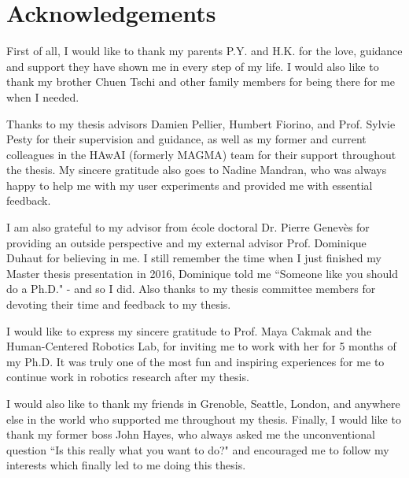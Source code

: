 \chapter*{Acknowledgements}
First of all, I would like to thank my parents P.Y. and H.K. for the love, guidance and support they have shown me in every step of my life.
I would also like to thank my brother Chuen Tschi and other family members for being there for me when I needed.

Thanks to my thesis advisors Damien Pellier, Humbert Fiorino, and Prof. Sylvie Pesty for their supervision and guidance, as well as my former and current colleagues in the HAwAI (formerly MAGMA) team for their support throughout the thesis.
My sincere gratitude also goes to Nadine Mandran, who was always happy to help me with my user experiments and provided me with essential feedback.

I am also grateful to my advisor from école doctoral Dr. Pierre Genevès for providing an outside perspective and my external advisor Prof. Dominique Duhaut for believing in me.
I still remember the time when I just finished my Master thesis presentation in 2016, Dominique told me ``Someone like you should do a Ph.D." - and so I did.
Also thanks to my thesis committee members for devoting their time and feedback to my thesis.

I would like to express my sincere gratitude to Prof. Maya Cakmak and the Human-Centered Robotics Lab, for inviting me to work with her for 5 months of my Ph.D.
It was truly one of the most fun and inspiring experiences for me to continue work in robotics research after my thesis.

I would also like to thank my friends in Grenoble, Seattle, London, and anywhere else in the world who supported me throughout my thesis.
Finally, I would like to thank my former boss John Hayes, who always asked me the unconventional question ``Is this really what you want to do?" and encouraged me to follow my interests which finally led to me doing this thesis.

